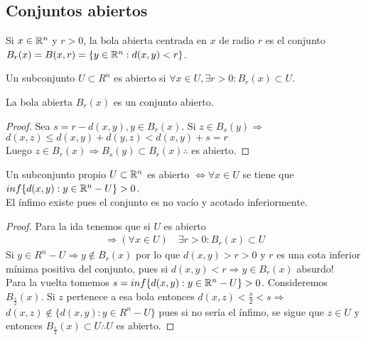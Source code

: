 \subsection{Conjuntos abiertos}
\begin{definition}
  Si $x \in \mathbb{R}^n$ y $r > 0$, la bola abierta centrada en $x$ de radio $r$ es el conjunto $B_r(x) = B(x,r) = \{ y \in \mathbb{R}^n : d(x, y) < r \}$.
\end{definition}

\begin{definition}
  Un subconjunto $U \subset R^n$ es abierto si $\forall x \in U, \exists r > 0 : B_r(x) \subset U$.
\end{definition}

\begin{lemma}
  La bola abierta $B_r(x)$ es un conjunto abierto.
  \begin{proof}
    Sea $s = r - d(x, y), y \in B_r(x)$. Si $z \in B_s(y) \Rightarrow$ \\
    $d(x, z) \leq d(x, y) + d(y, z) < d(x, y) + s = r$ \\
    Luego $z \in B_r(x) \Rightarrow B_s(y) \subset B_r(x) \therefore$ es abierto.
  \end{proof}
\end{lemma}

\begin{prop}
  Un subconjunto propio $U \subset \mathbb{R}^n$ es abierto $\iff \forall x \in U$ se tiene que $inf\{d(x, y) : y \in \mathbb{R}^n - U\} > 0$. \\
  El ínfimo existe pues el conjunto es no vacío y acotado inferiormente.
  \begin{proof}
    Para la ida tenemos que si $U$ es abierto
    \begin{align*}
      \Rightarrow (\forall x \in U) \quad \exists r > 0 : B_r(x) \subset U
    \end{align*}
    Si $y \in R^n - U \Rightarrow y \notin B_r(x)$ por lo que $d(x, y) > r > 0$ y $r$ es una cota inferior mínima positiva del conjunto, pues si $d(x,y) < r \Rightarrow y \in B_r(x)$ absurdo! \\

    Para la vuelta tomemos $s = inf\{ d(x,y) : y \in \mathbb{R}^n - U \} > 0$. Consideremos $B_{\frac{s}{2}}(x)$. Si $z$ pertenece a esa bola entonces $d(x, z) < \frac{s}{2} < s \Rightarrow$ \\
    $d(x, z) \notin \{ d(x,y) : y \in R^n - U \}$ pues si no sería el ínfimo, se sigue que $z \in U$ y entonces $B_{\frac{s}{2}}(x) \subset U \therefore U$ es abierto.
  \end{proof}
\end{prop}

